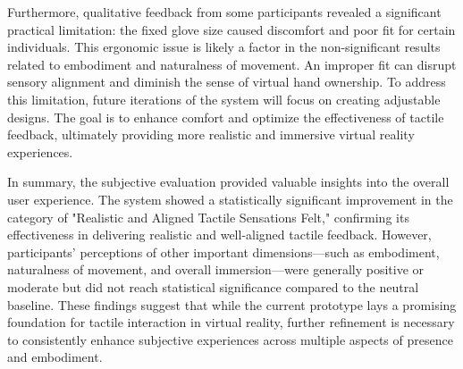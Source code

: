 Furthermore, qualitative feedback from some participants revealed a significant practical limitation: the fixed glove size caused discomfort and poor fit for certain individuals. This ergonomic issue is likely a factor in the non-significant results related to embodiment and naturalness of movement. An improper fit can disrupt sensory alignment and diminish the sense of virtual hand ownership. To address this limitation, future iterations of the system will focus on creating adjustable designs. The goal is to enhance comfort and optimize the effectiveness of tactile feedback, ultimately providing more realistic and immersive virtual reality experiences.

In summary, the subjective evaluation provided valuable insights into the overall user experience. The system showed a statistically significant improvement in the category of "Realistic and Aligned Tactile Sensations Felt," confirming its effectiveness in delivering realistic and well-aligned tactile feedback. However, participants' perceptions of other important dimensions—such as embodiment, naturalness of movement, and overall immersion—were generally positive or moderate but did not reach statistical significance compared to the neutral baseline. These findings suggest that while the current prototype lays a promising foundation for tactile interaction in virtual reality, further refinement is necessary to consistently enhance subjective experiences across multiple aspects of presence and embodiment.




